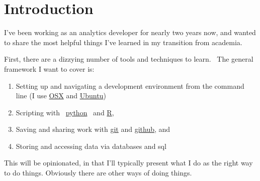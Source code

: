 \chapter{Introduction}
I've been working as an analytics developer for nearly two years now, and wanted 
to share the most helpful things I've learned in my transition from academia.

First, there are a dizzying number of tools and techniques to learn.  The general
framework I want to cover is:
\begin{enumerate}
  \item Setting up and navigating a development environment from the command line 
    (I use \href{https://www.apple.com/osx/}{OSX} and 
    \href{http://www.ubuntu.com/}{Ubuntu})
  \item Scripting with 
  \href{http://www.python.org/}{python} 
  and 
    \href{http://www.r-project.org/}{R},
  \item Saving and sharing work with \href{http://git-scm.com/}{git} 
    and \href{https://github.com/}{github}, and
  \item Storing and accessing data via databases and sql
\end{enumerate}

This will be opinionated, in that I'll typically present what I do as the right way 
to do things. Obviously there are other ways of doing things.
